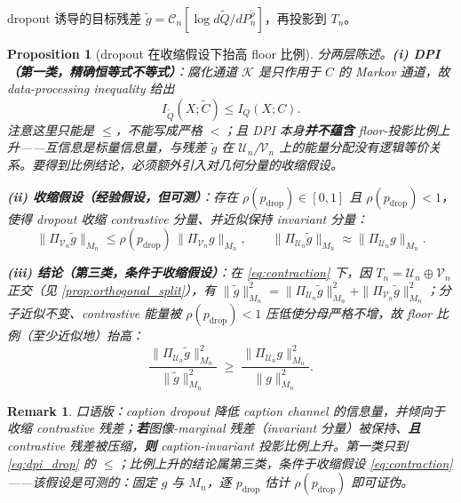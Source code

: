 \documentclass[11pt,a4paper]{article}
\newtheorem{proposition}[theorem]{Proposition}
\newtheorem{remark}[theorem]{Remark}
\newcommand{\cU}{\mathcal{U}}
\newcommand{\cV}{\mathcal{V}}
\newcommand{\cK}{\mathcal{K}}
\newcommand{\ProjectOp}{\Pi}
\newcommand{\Center}{\mathcal{C}}
\begin{document}
dropout 诱导的目标残差 $\tilde g = \Center_n[\log d\widetilde Q/dP_n^{\tilde\rho}]$，再投影到 $T_n$。

\begin{proposition}[dropout 在收缩假设下抬高 floor 比例]\label{prop:dropout_contraction}
分两层陈述。\textbf{(i) DPI（第一类，精确恒等式不等式）}：腐化通道 $\cK$ 是只作用于 $C$ 的 Markov 通道，故 data-processing inequality 给出
\begin{equation}\label{eq:dpi_drop}
I_{\widetilde Q}(X;\tilde C) \le I_Q(X;C).
\end{equation}
注意这里只能是 $\le$，不能写成严格 $<$；且 DPI 本身\textbf{并不蕴含} floor-投影比例上升——互信息是标量信息量，与残差 $\tilde g$ 在 $\cU_n$/$\cV_n$ 上的能量分配没有逻辑等价关系。要得到比例结论，必须额外引入对几何分量的收缩假设。

\textbf{(ii) 收缩假设（经验假设，但可测）}：存在 $\rho(p_{\mathrm{drop}})\in[0,1]$ 且 $\rho(p_{\mathrm{drop}})<1$，使得 dropout 收缩 contrastive 分量、并近似保持 invariant 分量：
\begin{equation}\label{eq:contraction}
\bigl\|\ProjectOp_{\cV_n}\tilde g\bigr\|_{M_n} \le \rho(p_{\mathrm{drop}})\,\bigl\|\ProjectOp_{\cV_n} g\bigr\|_{M_n},
\qquad
\bigl\|\ProjectOp_{\cU_n}\tilde g\bigr\|_{M_n} \approx \bigl\|\ProjectOp_{\cU_n} g\bigr\|_{M_n}.
\end{equation}

\textbf{(iii) 结论（第三类，条件于收缩假设）}：在 \eqref{eq:contraction} 下，因 $T_n=\cU_n\oplus\cV_n$ 正交（见 \ref{prop:orthogonal_split}），有 $\|\tilde g\|_{M_n}^2=\|\ProjectOp_{\cU_n}\tilde g\|_{M_n}^2+\|\ProjectOp_{\cV_n}\tilde g\|_{M_n}^2$；分子近似不变、contrastive 能量被 $\rho(p_{\mathrm{drop}})<1$ 压低使分母严格不增，故 floor 比例（至少近似地）抬高：
\begin{equation}
\frac{\bigl\|\ProjectOp_{\cU_n}\tilde g\bigr\|_{M_n}^2}{\|\tilde g\|_{M_n}^2}
\;\ge\;
\frac{\bigl\|\ProjectOp_{\cU_n} g\bigr\|_{M_n}^2}{\|g\|_{M_n}^2}.
\end{equation}
\end{proposition}

\begin{remark}
口语版：caption dropout 降低 caption channel 的信息量，并\emph{倾向于}收缩 contrastive 残差；\textbf{若}图像-marginal 残差（invariant 分量）被保持、\textbf{且} contrastive 残差被压缩，\textbf{则} caption-invariant 投影比例上升。第一类只到 \eqref{eq:dpi_drop} 的 $\le$；比例上升的结论属第三类，条件于收缩假设 \eqref{eq:contraction}——该假设是可测的：固定 $g$ 与 $M_n$，逐 $p_{\mathrm{drop}}$ 估计 $\rho(p_{\mathrm{drop}})$ 即可证伪。
\end{remark}
\end{document}

